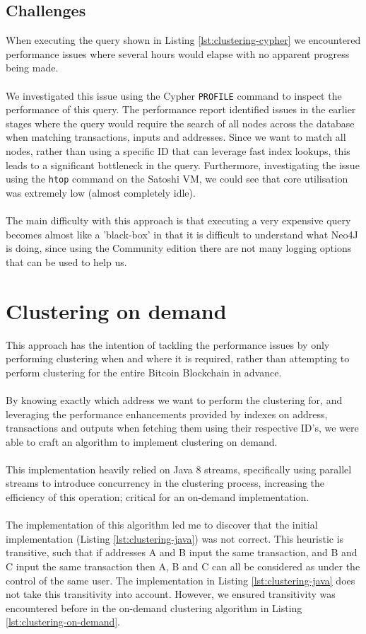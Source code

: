 \subsection{Challenges}
When executing the query shown in Listing \ref{lst:clustering-cypher} we encountered performance issues where several hours would elapse with no apparent progress being made. 
\\\\
We investigated this issue using the Cypher \texttt{PROFILE} command to inspect the performance of this query. The performance report identified issues in the earlier stages where the query would require the search of all nodes across the database when matching transactions, inputs and addresses. Since we want to match all nodes, rather than using a specific ID that can leverage fast index lookups, this leads to a significant bottleneck in the query. Furthermore, investigating the issue using the \texttt{htop} command on the Satoshi VM, we could see that core utilisation was extremely low (almost completely idle).
\\\\
The main difficulty with this approach is that executing a very expensive query becomes almost like a 'black-box' in that it is difficult to understand what Neo4J is doing, since using the Community edition there are not many logging options that can be used to help us.

\section{Clustering on demand}
This approach has the intention of tackling the performance issues by only performing clustering when and where it is required, rather than attempting to perform clustering for the entire Bitcoin Blockchain in advance. 
\\\\
By knowing exactly which address we want to perform the clustering for, and leveraging the performance enhancements provided by indexes on address, transactions and outputs when fetching them using their respective ID's, we were able to craft an algorithm to implement clustering on demand.
\\\\
This implementation heavily relied on Java 8 streams, specifically using parallel streams to introduce concurrency in the clustering process, increasing the efficiency of this operation; critical for an on-demand implementation. 
\\\\
The implementation of this algorithm led me to discover that the initial implementation (Listing \ref{lst:clustering-java}) was not correct. This heuristic is transitive, such that if addresses A and B input the same transaction, and B and C input the same transaction then A, B and C can all be considered as under the control of the same user. The implementation in Listing \ref{lst:clustering-java} does not take this transitivity into account. However, we ensured transitivity was encountered before in the on-demand clustering algorithm in Listing \ref{lst:clustering-on-demand}.

